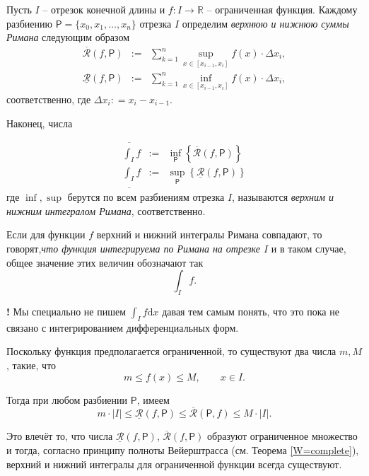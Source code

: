 \begin{definition}\label{Rieman_sums_and_int}
    Пусть $I$ -- отрезок конечной длины и $f:I \to \mathbb{R}$ -- ограниченная функция. Каждому разбиению $\mathsf{P} = \{x_0,x_1,\ldots, x_n\}$ отрезка $I$ определим \textit{верхнюю и нижнюю суммы Римана} следующим образом
    \begin{eqnarray*}
        \overline{\mathcal{R}}(f, \mathsf{P}) &:=& \sum_{k=1}^n \sup_{x \in [x_{i-1}, x_i]} f(x) \cdot \Delta x_i, \\
        \underline{\mathcal{R}}(f, \mathsf{P}) &:=& \sum_{k=1}^n \inf_{x \in [x_{i-1}, x_i]} f(x) \cdot \Delta x_i,
    \end{eqnarray*}
соответственно, где $\Delta x_i: = x_i -x_{i-1}$.

Наконец, числа

\begin{eqnarray*}
 \overline{\int_I} f &:=& \inf_\mathsf{P} \left\{\overline{\mathcal{R}} (f, \mathsf{P}) \right\} \\
 \underline{\int_I} f &:=& \sup_\mathsf{P} \left\{\underline{\mathcal{R}} (f, \mathsf{P}) \right\}
\end{eqnarray*}
где $\inf, \sup$ берутся по всем разбиениям отрезка $I$, называются \textit{верхним и нижним интегралом Римана}, соответственно. 

Если для функции $f$ верхний и нижний интегралы Римана совпадают, то говорят,\textit{что функция интегрируема по Римана на отрезке $I$} и в таком случае, общее значение этих величин обозначают так
\[
 \int_I f.
\]
\end{definition}

\begin{mydanger}{\bf !}
    Мы специально не пишем $\int_I f\mathrm{d}x$ давая тем самым понять, что это пока не связано с интегрированием дифференциальных форм.
\end{mydanger}

\begin{remark}\label{good_remark_for_Rieman}
    Поскольку функция предполагается ограниченной, то существуют два числа $m, M$, такие, что
    \[
     m \le f(x) \le M, \qquad x \in I.
    \]

    Тогда при любом разбиении $\mathsf{P}$, имеем
    \[
     m \cdot |I| \le \underline{\mathcal{R}}(f,\mathsf{P}) \le \overline{\mathcal{R}}(\mathsf{P},f) \le M \cdot |I|.
    \]

    Это влечёт то, что числа $\underline{\mathcal{R}}(f,\mathsf{P})$, $\overline{\mathcal{R}}(f,\mathsf{P})$ образуют ограниченное множество и тогда, согласно принципу полноты Вейерштрасса (см. Теорема \ref{W=complete}), верхний и нижний интегралы для ограниченной функции всегда существуют.
\end{remark}

